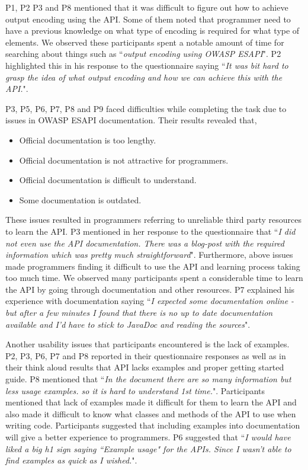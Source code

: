 \documentclass[10pt]{article}
\begin{document}
P1, P2 P3 and P8 mentioned that it was difficult to figure out how to achieve output encoding using the API. Some of them noted that programmer need to have a previous knowledge on what type of encoding is required for what type of elements. We observed these participants spent a notable amount of time for searching about things such as ``\textit{output encoding using OWASP ESAPI}". P2 highlighted this in his response to the questionnaire saying ``\textit{It was bit hard to grasp the idea of what output encoding and how we can achieve this with the API.}".

P3, P5, P6, P7, P8 and P9 faced difficulties while completing the task due to issues in OWASP ESAPI documentation. Their results revealed that,

\begin{itemize}
\item Official documentation is too lengthy.
\item Official documentation is not attractive for programmers.
\item Official documentation is difficult to understand.
\item Some documentation is outdated.
\end{itemize}

These issues resulted in programmers referring to unreliable third party resources to learn the API. P3 mentioned in her response to the questionnaire that ``\textit{I did not even use the API documentation. There was a blog-post with the required information which was pretty much straightforward}". Furthermore, above issues made programmers finding it difficult to use the API and learning process taking too much time. We observed many participants spent a considerable time to learn the API by going through documentation and other resources. P7 explained his experience with documentation saying ``\textit{I expected some documentation online - but after a few minutes I found that there is no up to date documentation available and I'd have to stick to JavaDoc and reading the sources}".

Another usability issues that participants encountered is the lack of examples. P2, P3, P6, P7 and P8 reported in their questionnaire responses as well as in their think aloud results that API lacks examples and proper getting started guide. P8 mentioned that ``\textit{In the document there are so many information but less usage examples. so it is hard to understand 1st time.}".  Participants mentioned that lack of examples made it difficult for them to learn the API and also made it difficult to know what classes and methods of the API to use when writing code. Participants suggested that including examples into documentation will give a better experience to programmers. P6 suggested that ``\textit{I would have liked a big h1 sign saying ``Example usage" for the APIs. Since I wasn't able to find examples as quick as I wished.}".
\end{document}
